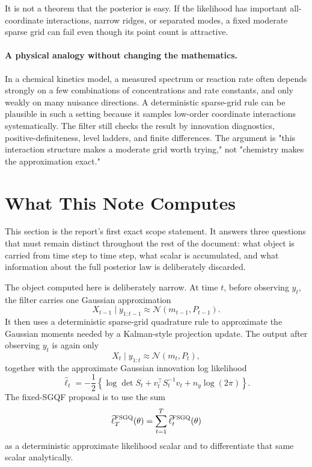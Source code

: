 \documentclass[11pt]{article}
\numberwithin{equation}{section}
\newcommand{\N}{\mathcal N}
\newcommand{\ellhat}{\widehat\ell}
\begin{document}
It is not a theorem that the posterior is easy.  If the likelihood has
important all-coordinate interactions, narrow ridges, or separated modes, a
fixed moderate sparse grid can fail even though its point count is attractive.

\paragraph{A physical analogy without changing the mathematics.}
In a chemical kinetics model, a measured spectrum or reaction rate often
depends strongly on a few combinations of concentrations and rate constants,
and only weakly on many nuisance directions.  A deterministic sparse-grid rule
can be plausible in such a setting because it samples low-order coordinate
interactions systematically.  The filter still checks the result by innovation
diagnostics, positive-definiteness, level ladders, and finite differences.  The
argument is "this interaction structure makes a moderate grid worth trying,"
not "chemistry makes the approximation exact."

\section{What This Note Computes}
\label{sec:p31-computes}

This section is the report's first exact scope statement.  It answers three
questions that must remain distinct throughout the rest of the document:
what object is carried from time step to time step, what scalar is accumulated,
and what information about the full posterior law is deliberately discarded.

The object computed here is deliberately narrow.  At time \(t\), before
observing \(y_t\), the filter carries one Gaussian approximation
\begin{equation}
  X_{t-1}\mid y_{1:t-1}
  \approx
  \N(m_{t-1},P_{t-1}).
  \label{eq:p31-carried-gaussian}
\end{equation}
It then uses a deterministic sparse-grid quadrature rule to approximate the
Gaussian moments needed by a Kalman-style projection update.  The output after
observing \(y_t\) is again only
\begin{equation}
  X_t\mid y_{1:t}
  \approx
  \N(m_t,P_t),
  \label{eq:p31-output-gaussian}
\end{equation}
together with the approximate Gaussian innovation log likelihood
\begin{equation}
  \ellhat_t
  =
  -\frac12
  \left\{
  \log\det S_t+v_t^\top S_t^{-1}v_t+n_y\log(2\pi)
  \right\}.
  \label{eq:p31-innovation-loglik-opening}
\end{equation}
The fixed-SGQF proposal is to use the sum
\begin{equation}
  \ellhat_T^{\rm FSGQ}(\theta)=\sum_{t=1}^T \ellhat_t^{\rm FSGQ}(\theta)
  \label{eq:p31-total-fixed-scalar-opening}
\end{equation}
as a deterministic approximate likelihood scalar and to differentiate that
same scalar analytically.
\end{document}
